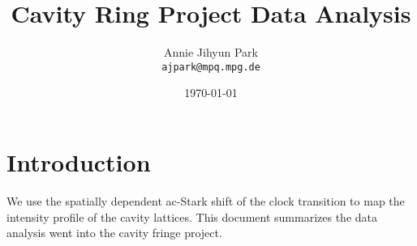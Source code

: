 \documentclass[bibnotes]{article}
\title{Cavity Ring Project Data Analysis} %
\author{Annie Jihyun Park\\ \texttt{ajpark@mpq.mpg.de}} %
\date{\today} %
\begin{document}
\maketitle %


\section*{Introduction} %

	We use the spatially dependent ac-Stark shift of the clock transition to map the intensity profile of the cavity lattices. This document summarizes the data analysis went into the cavity fringe project. 

\tableofcontents




\end{document}
